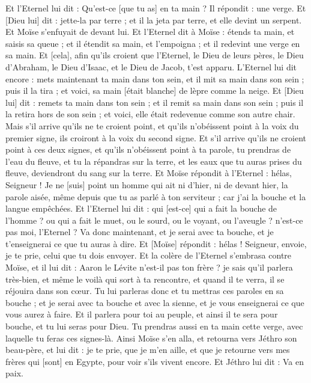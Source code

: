 \begin{multicols}{2}
Et l'Eternel lui dit : Qu'est-ce [que tu as] en ta main ? Il répondit : une verge.
Et [Dieu lui] dit : jette-la par terre ; et il la jeta par terre, et elle devint un serpent. Et Moïse s'enfuyait de devant lui.
Et l'Eternel dit à Moïse : étends ta main, et saisis sa queue ; et il étendit sa main, et l'empoigna ; et il redevint une verge en sa main.
Et [cela], afin qu'ils croient que l'Eternel, le Dieu de leurs pères, le Dieu d'Abraham, le Dieu d'Isaac, et le Dieu de Jacob, t'est apparu.
L'Eternel lui dit encore : mets maintenant ta main dans ton sein, et il mit sa main dans son sein ; puis il la tira ; et voici, sa main [était blanche] de lèpre comme la neige.
Et [Dieu lui] dit : remets ta main dans ton sein ; et il remit sa main dans son sein ; puis il la retira hors de son sein ; et voici, elle était redevenue comme son autre chair.
Mais s'il arrive qu'ils ne te croient point, et qu'ils n'obéissent point à la voix du premier signe, ils croiront à la voix du second signe.
Et s'il arrive qu'ils ne croient point à ces deux signes, et qu'ils n'obéissent point à ta parole, tu prendras de l'eau du fleuve, et tu la répandras sur la terre, et les eaux que tu auras prises du fleuve, deviendront du sang sur la terre.
Et Moïse répondit à l'Eternel : hélas, Seigneur ! Je ne [suis] point un homme qui ait ni d'hier, ni de devant hier, la parole aisée, même depuis que tu as parlé à ton serviteur ; car j'ai la bouche et la langue empêchées.
Et l'Eternel lui dit : qui [est-ce] qui a fait la bouche de l'homme ? ou qui a fait le muet, ou le sourd, ou le voyant, ou l'aveugle ? n'est-ce pas moi, l'Eternel ?
Va donc maintenant, et je serai avec ta bouche, et je t'enseignerai ce que tu auras à dire.
Et [Moïse] répondit : hélas ! Seigneur, envoie, je te prie, celui que tu dois envoyer.
Et la colère de l'Eternel s'embrasa contre Moïse, et il lui dit : Aaron le Lévite n'est-il pas ton frère ? je sais qu'il parlera très-bien, et même le voilà qui sort à ta rencontre, et quand il te verra, il se réjouira dans son cœur.
Tu lui parleras donc et tu mettras ces paroles en sa bouche ; et je serai avec ta bouche et avec la sienne, et je vous enseignerai ce que vous aurez à faire.
Et il parlera pour toi au peuple, et ainsi il te sera pour bouche, et tu lui seras pour Dieu.
Tu prendras aussi en ta main cette verge, avec laquelle tu feras ces signes-là.
Ainsi Moïse s'en alla, et retourna vers Jéthro son beau-père, et lui dit : je te prie, que je m'en aille, et que je retourne vers mes frères qui [sont] en Egypte, pour voir s'ils vivent encore. Et Jéthro lui dit : Va en paix.

\end{multicols}
